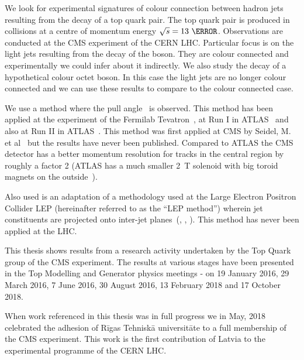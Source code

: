 We look for experimental signatures of colour connection between hadron jets resulting from the decay of a top quark pair. The top quark pair is produced in \Pp\Pp collisions at a centre of momentum energy $\sqrt{s}=13~\TeV$. Observations are conducted at the CMS experiment of the CERN LHC. Particular focus is on the light jets resulting from the decay of the \PW boson. They are colour connected and experimentally we could infer about it indirectly. We also study the decay of a hypothetical colour octet \PW boson. In this case the light jets are no longer colour connected and we can use these results to compare to the colour connected case. 

We use a method where the pull angle~\cite{Gallicchio:2010sw} is observed. This method has been applied at the \DZERO experiment of the Fermilab Tevatron~\cite{Abazov:2011vh}, at Run I in ATLAS~\cite{Aad:2015lxa} and also at Run II in ATLAS~\cite{Aaboud:2018ibj}. This method was first applied at CMS by Seidel, M. et al~\cite{indico:Markus_cf} but the results have never been published. Compared to ATLAS the CMS detector has a better momentum resolution for tracks in the central region by roughly a factor 2 (ATLAS has a much smaller 2~T solenoid with big toroid magnets on the outside~\cite{Aad:2008zzm}).

Also used is an adaptation of a methodology used at the Large Electron Positron Collider LEP (hereinafter referred to as the ``LEP method'') wherein jet constituents are projected onto inter-jet planes~(\cite{Abbiendi:2005es}, \cite{Abdallah:2006uq}, \cite{Achard:2003pe}). This method has never been applied at the LHC.

This thesis shows results from a research activity undertaken by the Top Quark group of the CMS experiment. The results at various stages have been presented in the Top Modelling and Generator physics meetings - on 19 January 2016, 29 March 2016, 7 June 2016, 30 August 2016, 13 February 2018 and 17 October 2018.

When work referenced in this thesis was in full progress we in May, 2018 celebrated the adhesion of Rīgas Tehniskā universitāte to a full membership of the CMS experiment. This work is the first contribution of Latvia to the experimental programme of the CERN LHC.
